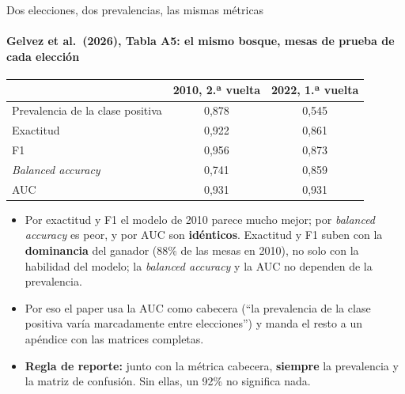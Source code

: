 \documentclass{beamer}
\newcommand{\1}{\mathbb{I}}
\begin{document}
\begin{frame}{Dos elecciones, dos prevalencias, las mismas métricas}
\framesubtitle{Gelvez et al.\ (2026), Tabla A5: el mismo bosque, mesas de prueba de cada elección}
\small
\begin{center}
\footnotesize
\setlength{\tabcolsep}{5pt}
\renewcommand{\arraystretch}{1.1}
\begin{tabular}{lcc}
\hline
 & 2010, 2.ª vuelta & 2022, 1.ª vuelta \\
\hline
Prevalencia de la clase positiva & 0,878 & 0,545 \\
Exactitud & 0,922 & 0,861 \\
F1 & 0,956 & 0,873 \\
\emph{Balanced accuracy} & 0,741 & 0,859 \\
AUC & 0,931 & 0,931 \\
\hline
\end{tabular}
\end{center}
\pause
\begin{itemize}\itemsep4pt
  \item Por exactitud y F1 el modelo de 2010 parece mucho mejor; por \emph{balanced accuracy} es peor, y por AUC son \textbf{idénticos}. Exactitud y F1 suben con la \textbf{dominancia} del ganador (88\% de las mesas en 2010), no solo con la habilidad del modelo; la \emph{balanced accuracy} y la AUC no dependen de la prevalencia. \pause
  \item Por eso el paper usa la AUC como cabecera (``la prevalencia de la clase positiva varía marcadamente entre elecciones'') y manda el resto a un apéndice con las matrices completas. \pause
  \item \textbf{Regla de reporte:} junto con la métrica cabecera, \textbf{siempre} la prevalencia y la matriz de confusión. Sin ellas, un 92\% no significa nada.
\end{itemize}
\end{frame}
\end{document}
